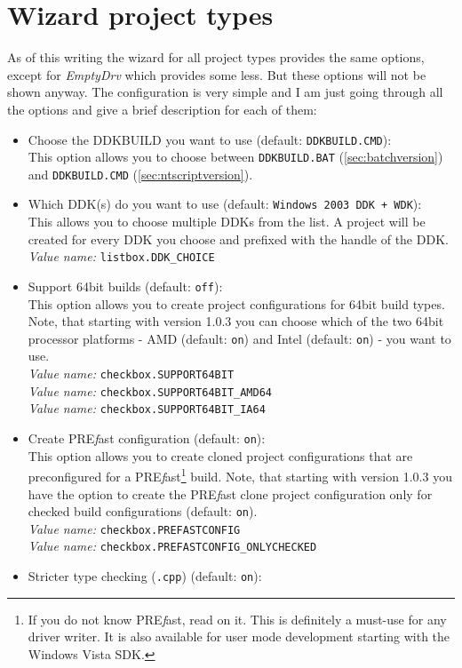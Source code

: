 \documentclass[a4paper,titlepage]{report}
\newcommand{\default}[1]{\textcolor[gray]{0.40}{(default: \texttt{#1})}}
\newcommand{\option}[1]{\textcolor[rgb]{0.00,0.20,0.20}{\textsf{#1}}}
\newcommand{\optiondeco}[1]{#1\vspace{0.1cm}}
\newcommand{\inioption}[1]{\\\textcolor[rgb]{0.00,0.00,0.40}{\textsl{Value name:} \texttt{#1}}}
\newcommand{\prefast}[0]{\textsf{PRE\textsl{f}ast}}
\begin{document}
\section{Wizard project types}
\label{sec:projtypes}
As of this writing the wizard for all project types provides the same options,
except for \emph{EmptyDrv} which provides some less. But these options
will not be shown anyway.
The configuration is very simple and I am just going through all the
options and give a brief description for each of them:
\begin{itemize}
  \item \optiondeco{\option{Choose the DDKBUILD you want to use} \default{DDKBUILD.CMD}:}\\
  This option allows you to choose between \texttt{DDKBUILD.BAT} (\autoref{sec:batchversion})
  and \texttt{DDKBUILD.CMD} (\autoref{sec:ntscriptversion}).
  \item \optiondeco{\option{Which DDK(s) do you want to use} \default{Windows 2003 DDK + WDK}:}\\
  This allows you to choose multiple DDKs from the list.
  A project will be created for every DDK you choose and prefixed with
  the handle of the DDK.
  \inioption{listbox.DDK\_CHOICE}
  \item \optiondeco{\option{Support 64bit builds} \default{off}:}\\
  This option allows you to create project configurations for
  64bit build types.
  Note, that starting with version 1.0.3 you can choose which of the two 64bit
  processor platforms - AMD \default{on} and Intel \default{on} - you want to use.
  \inioption{checkbox.SUPPORT64BIT}
  \inioption{checkbox.SUPPORT64BIT\_AMD64}
  \inioption{checkbox.SUPPORT64BIT\_IA64}
  \item \optiondeco{\option{Create \prefast{} configuration} \default{on}:}\\
  This option allows you to create cloned project configurations that
  are preconfigured for a \prefast{}\footnote{If you do not know \prefast{}, read on it.
  This is definitely a must-use for any driver writer. It is also available
  for user mode development starting with the Windows Vista SDK.} build.
  Note, that starting with version 1.0.3 you have the option to create the \prefast{}
  clone project configuration only for checked build configurations \default{on}.
  \inioption{checkbox.PREFASTCONFIG}
  \inioption{checkbox.PREFASTCONFIG\_ONLYCHECKED}
  \item \optiondeco{\option{Stricter type checking (\texttt{.cpp})} \default{on}:}\\

\end{itemize}
\end{document}
